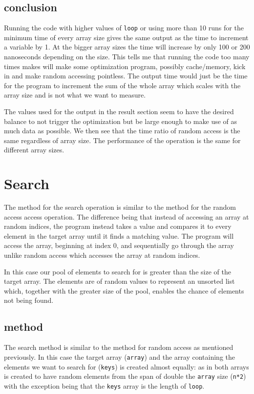 \documentclass[a4paper,11pt]{article}
\begin{document}
\subsection*{conclusion}

Running the code with higher values of {\tt loop} or using more than 10 
runs for the minimum time of every array size gives the same output as 
the time to increment a variable by 1. At the bigger array sizes the
time will increase by only 100 or 200 nanoseconds depending on the size.
This tells me that running the code too many times makes will make some
optimization program, possibly cache/memory, kick in and make random 
accessing pointless. The output time would just be the time for the 
program to increment the sum of the whole array which scales with the
array size and is not what we want to measure.

The values used for the output in the result section seem to have the
desired balance to not trigger the optimization but be large enough to
make use of as much data as possible. We then see that the time ratio of
random access is the same regardless of array size. The performance of
the operation is the same for different array sizes.

\section*{Search}

The method for the search operation is similar to the method for the
random access access operation. The difference being that instead of
accessing an array at random indices, the program instead takes a value 
and compares it to every element in the target array until it finds a
matching value. The program will access the array, beginning at index 0,
and sequentially go through the array unlike random access which 
accesses the array at random indices.

In this case our pool of elements to search for is greater than the size
of the target array. The elements are of random values to represent an
unsorted list which, together with the greater size of the pool, enables
the chance of elements not being found.

\subsection*{method}

The search method is similar to the method for random access as mentioned
previously. In this case the target array ({\tt array}) and the array
containing the elements we want to search for ({\tt keys}) is created
almost equally: as in both arrays is created to have random elements
from the span of double the {\tt array} size ({\tt n*2}) with the 
exception being that the {\tt keys} array is the length of {\tt loop}.
\end{document}
